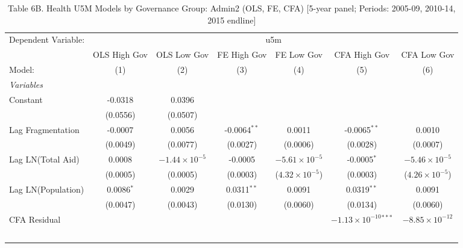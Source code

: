 
\begin{table}[H]
   \caption{Table 6B. Health U5M Models by Governance Group: Admin2 (OLS, FE, CFA) [5-year panel; Periods: 2005-09, 2010-14, 2015 endline]}
   \centering
   \begin{tabular}{lcccccc}
      \tabularnewline \midrule \midrule
      Dependent Variable: & \multicolumn{6}{c}{u5m}\\
                         & OLS High Gov & OLS Low Gov            & FE High Gov    & FE Low Gov              & CFA High Gov                    & CFA Low Gov \\   
      Model:             & (1)          & (2)                    & (3)            & (4)                     & (5)                             & (6)\\  
      \midrule
      \emph{Variables}\\
      Constant           & -0.0318      & 0.0396                 &                &                         &                                 &   \\   
                         & (0.0556)     & (0.0507)               &                &                         &                                 &   \\   
      Lag Fragmentation  & -0.0007      & 0.0056                 & -0.0064$^{**}$ & 0.0011                  & -0.0065$^{**}$                  & 0.0010\\   
                         & (0.0049)     & (0.0077)               & (0.0027)       & (0.0006)                & (0.0028)                        & (0.0007)\\   
      Lag LN(Total Aid)  & 0.0008       & $-1.44\times 10^{-5}$  & -0.0005        & $-5.61\times 10^{-5}$   & -0.0005$^{*}$                   & $-5.46\times 10^{-5}$\\    
                         & (0.0005)     & (0.0005)               & (0.0003)       & ($4.32\times 10^{-5}$)  & (0.0003)                        & ($4.26\times 10^{-5}$)\\    
      Lag LN(Population) & 0.0086$^{*}$ & 0.0029                 & 0.0311$^{**}$  & 0.0091                  & 0.0319$^{**}$                   & 0.0091\\   
                         & (0.0047)     & (0.0043)               & (0.0130)       & (0.0060)                & (0.0134)                        & (0.0060)\\   
      CFA Residual       &              &                        &                &                         & $-1.13\times 10^{-10}$$^{***}$  & $-8.85\times 10^{-12}$\\    
$$
\end{tabular}
\end{table}
